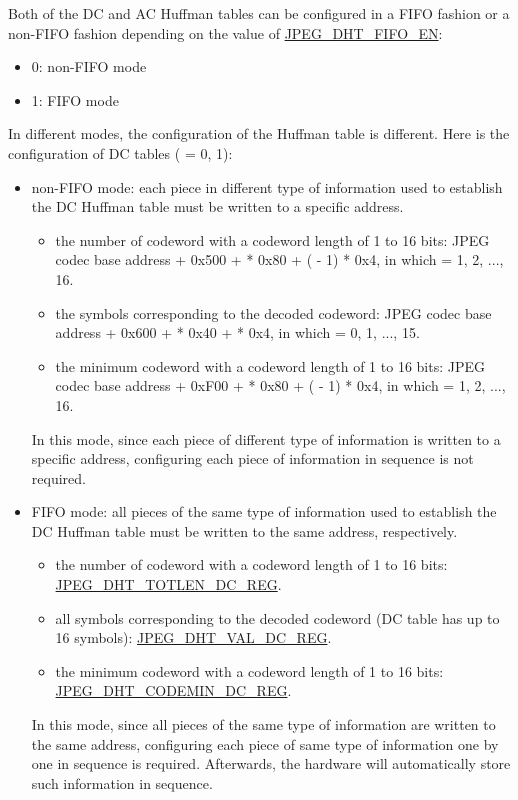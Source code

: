 \documentclass[main\_\_EN.tex]{subfiles}
\begin{document}
Both of the DC and AC Huffman tables can be configured in a FIFO fashion or a non-FIFO fashion depending on the value of \hyperref[fielddesc:JPEGDHTFIFOEN]{JPEG\_DHT\_FIFO\_EN}:
\begin{itemize}
    \item 0: non-FIFO mode
    \item 1: FIFO mode
\end{itemize}

In different modes, the configuration of the Huffman table is different. Here is the configuration of DC tables ( = 0, 1):
\begin{itemize}
    \item non-FIFO mode: each piece in different type of information used to establish the DC Huffman table must be written to a specific address.
    \begin{itemize}
        \item the number of codeword with a codeword length of 1 to 16 bits: JPEG codec base address + 0x500 +  * 0x80 + ( - 1) * 0x4, in which  = 1, 2, ..., 16.
        \item the symbols corresponding to the decoded codeword: JPEG codec base address + 0x600 +  * 0x40 +  * 0x4, in which  = 0, 1, ..., 15.
        \item the minimum codeword with a codeword length of 1 to 16 bits: JPEG codec base address + 0xF00 +  * 0x80 + ( - 1) * 0x4, in which  = 1, 2, ..., 16.
    \end{itemize}
    In this mode, since each piece of different type of information is written to a specific address, configuring each piece of information in sequence is not required.
    \item FIFO mode: all pieces of the same type of information used to establish the DC Huffman table must be written to the same address, respectively.
    \begin{itemize}
        \item the number of codeword with a codeword length of 1 to 16 bits: \hyperref[regdesc:JPEGDHTTOTLENDC0REG]{JPEG\_DHT\_TOTLEN\_DC\_REG}.
        \item all symbols corresponding to the decoded codeword (DC table has up to 16 symbols): \hyperref[regdesc:JPEGDHTVALDC0REG]{JPEG\_DHT\_VAL\_DC\_REG}.
        \item the minimum codeword with a codeword length of 1 to 16 bits:  \hyperref[regdesc:JPEGDHTCODEMINDC0REG]{JPEG\_DHT\_CODEMIN\_DC\_REG}.
    \end{itemize}
    In this mode, since all pieces of the same type of information are written to the same address, configuring each piece of same type of information one by one in sequence is required. Afterwards, the hardware will automatically store such information in sequence.
\end{itemize}
\end{document}
